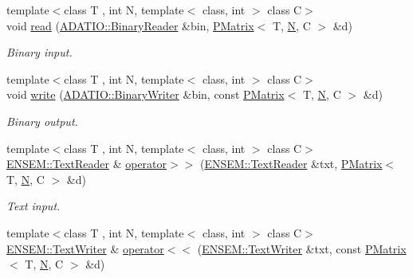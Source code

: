 \begin{DoxyCompactItemize}
\item 
{\footnotesize template$<$class T , int N, template$<$ class, int $>$ class C$>$ }\\void \mbox{\hyperlink{group__primmatrix_ga95daf5fb6c2f089f11774d123f8795d5}{read}} (\mbox{\hyperlink{classADATIO_1_1BinaryReader}{A\+D\+A\+T\+I\+O\+::\+Binary\+Reader}} \&bin, \mbox{\hyperlink{classENSEM_1_1PMatrix}{P\+Matrix}}$<$ T, \mbox{\hyperlink{operator__name__util_8cc_a7722c8ecbb62d99aee7ce68b1752f337}{N}}, C $>$ \&d)
\begin{DoxyCompactList}\small\item\em Binary input. \end{DoxyCompactList}\item 
{\footnotesize template$<$class T , int N, template$<$ class, int $>$ class C$>$ }\\void \mbox{\hyperlink{group__primmatrix_ga7255316b449512a4081c99a02e485e4c}{write}} (\mbox{\hyperlink{classADATIO_1_1BinaryWriter}{A\+D\+A\+T\+I\+O\+::\+Binary\+Writer}} \&bin, const \mbox{\hyperlink{classENSEM_1_1PMatrix}{P\+Matrix}}$<$ T, \mbox{\hyperlink{operator__name__util_8cc_a7722c8ecbb62d99aee7ce68b1752f337}{N}}, C $>$ \&d)
\begin{DoxyCompactList}\small\item\em Binary output. \end{DoxyCompactList}\item 
{\footnotesize template$<$class T , int N, template$<$ class, int $>$ class C$>$ }\\\mbox{\hyperlink{classENSEM_1_1TextReader}{E\+N\+S\+E\+M\+::\+Text\+Reader}} \& \mbox{\hyperlink{group__primmatrix_ga94a915150324a06d2d330515358811f2}{operator$>$$>$}} (\mbox{\hyperlink{classENSEM_1_1TextReader}{E\+N\+S\+E\+M\+::\+Text\+Reader}} \&txt, \mbox{\hyperlink{classENSEM_1_1PMatrix}{P\+Matrix}}$<$ T, \mbox{\hyperlink{operator__name__util_8cc_a7722c8ecbb62d99aee7ce68b1752f337}{N}}, C $>$ \&d)
\begin{DoxyCompactList}\small\item\em Text input. \end{DoxyCompactList}\item 
{\footnotesize template$<$class T , int N, template$<$ class, int $>$ class C$>$ }\\\mbox{\hyperlink{classENSEM_1_1TextWriter}{E\+N\+S\+E\+M\+::\+Text\+Writer}} \& \mbox{\hyperlink{group__primmatrix_gafa0f739db2eca6b8b80d632ce81f78b7}{operator$<$$<$}} (\mbox{\hyperlink{classENSEM_1_1TextWriter}{E\+N\+S\+E\+M\+::\+Text\+Writer}} \&txt, const \mbox{\hyperlink{classENSEM_1_1PMatrix}{P\+Matrix}}$<$ T, \mbox{\hyperlink{operator__name__util_8cc_a7722c8ecbb62d99aee7ce68b1752f337}{N}}, C $>$ \&d)

\end{DoxyCompactItemize}
